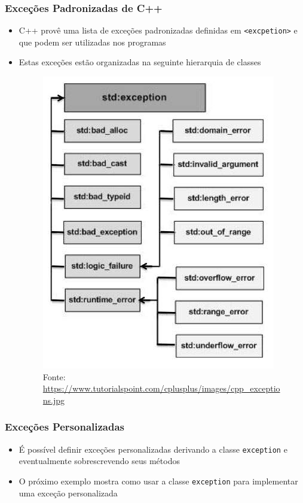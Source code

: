 \documentclass[xcolor={dvipsnames,table},aspectratio=169]{beamer}
\begin{document}
\begin{frame}\frametitle{Exceções Padronizadas de C++}
\begin{itemize}
	\item C++ provê uma lista de exceções padronizadas definidas em \texttt{\textless{}excpetion\textgreater} e que podem ser utilizadas nos programas
	\item Estas exceções estão organizadas na seguinte hierarquia de classes
\begin{figure}[h]
	\includegraphics[height=0.55\paperheight]{imagens/cpp_exceptions.jpg}\\\tiny{Fonte: \url{https://www.tutorialspoint.com/cplusplus/images/cpp_exceptions.jpg}}
\end{figure}
\end{itemize}
\end{frame}

\begin{frame}\frametitle{Exceções Personalizadas}
\begin{itemize}
	\item É possível definir exceções personalizadas derivando a classe \texttt{exception} e eventualmente sobrescrevendo seus métodos
    \item O próximo exemplo mostra como usar a classe \texttt{exception} para implementar uma exceção personalizada
\end{itemize}
\end{frame}
\end{document}
